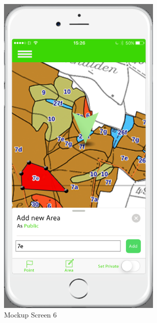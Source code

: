 \begin{figure}[h]
\centering
    \includegraphics[width=0.7\textwidth]{mockup1-6}
    \caption{Mockup Screen 6}
    \label{fig:mesh6}
\end{figure}

